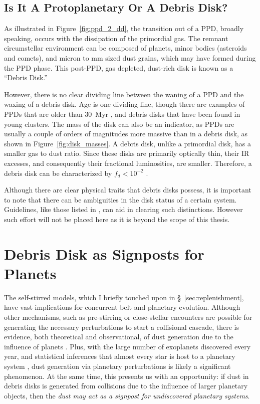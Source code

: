        
    \subsection{Is It A Protoplanetary Or A Debris Disk?}
    
    As illustrated in Figure~\ref{fig:ppd_2_dd}, the transition out of a PPD, broadly speaking, occurs with the dissipation of the primordial gas. The remnant circumstellar environment can be composed of planets, minor bodies (asteroids and comets), and micron to mm sized dust grains, which may have formed during the PPD phase. This post-PPD, gas depleted, dust-rich disk is known as a ``Debris Disk.'' %
    
    However, there is no clear dividing line between the waning of a PPD and the waxing of a debris disk. Age is one dividing line, though there are examples of PPDs that are older than 30~Myr \citep{DeMarchi2013,Scicluna2014}, and debris disks that have been found in young clusters. The mass of the disk can also be an indicator, as PPDs are usually a couple of orders of magnitudes more massive than in a debris disk, as shown in Figure~\ref{fig:disk_masses}. A debris disk, unlike a primordial disk, has a smaller gas to dust ratio. Since these disks are primarily optically thin, their IR excesses, and consequently their fractional luminosities, are smaller. Therefore, a debris disk can be characterized by $f_d<10^{-2}$ \citep{Zuckerman2001, Wyatt2008}. 
    
    Although there are clear physical traits that debris disks possess, it is important to note that there can be ambiguities in the disk status of a certain system. Guidelines, like those listed in \citet{Wyatt2015}, can aid in clearing such distinctions. However such effort will not be placed here as it is beyond the scope of this thesis.
    
    
\section{Debris Disk as Signposts for Planets} \label{sec:disks_signposts_planets}
    
    The self-stirred models, which I briefly touched upon in \S~\ref{sec:replenishment}, have vast implications for concurrent belt and planetary evolution. Although other mechanisms, such as pre-stirring or close-stellar encounters are possible for generating the necessary perturbations to start a collisional cascade, there is evidence, both theoretical and observational, of dust generation due to the influence of planets \citep[e.g., the HD~141569 system,][]{Wyatt2005}. Plus, with the large number of exoplanets discovered every year, and statistical inferences that almost every star is host to a planetary system \citep{Cassan2012}, dust generation via planetary perturbations is likely a significant phenomenon. At the same time, this presents us with an opportunity: if dust in debris disks is generated from collisions due to the influence of larger planetary objects, then the \textit{dust may act as a signpost for undiscovered planetary systems}.
    
